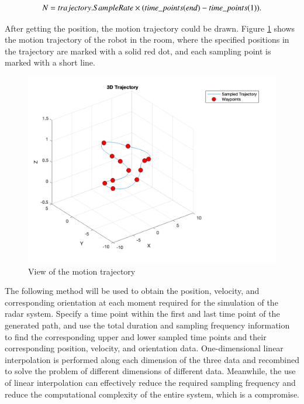 \documentclass[12pt,DIV14,BCOR12mm,a4paper,footinclude=false,headinclude,parskip=half-,twoside,openright,cleardoublepage=empty,toc=index,bibliography=totoc,listof=totoc]{scrreprt}
\numberwithin{equation}{chapter}
\begin{document}
\begin{equation}
    \centering
    N = trajectory.SampleRate \times (time\_points(end) - time\_points(1)).
\end{equation}

After getting the position, the motion trajectory could be drawn. Figure \ref{view of the motion trajectory} shows the motion trajectory of the robot in the room, where the specified positions in the trajectory are marked with a solid red dot, and each sampling point is marked with a short line.

\begin{figure}
	\centering
	\includegraphics[scale=.3]{figures/trajectory.png}
	\caption{View of the motion trajectory}
	\label{view of the motion trajectory}
\end{figure}

The following method will be used to obtain the position, velocity, and corresponding orientation at each moment required for the simulation of the radar system. Specify a time point within the first and last time point of the generated path, and use the total duration and sampling frequency information to find the corresponding upper and lower sampled time points and their corresponding position, velocity, and orientation data. One-dimensional linear interpolation is performed along each dimension of the three data and recombined to solve the problem of different dimensions of different data. Meanwhile, the use of linear interpolation can effectively reduce the required sampling frequency and reduce the computational complexity of the entire system, which is a compromise.
\end{document}
